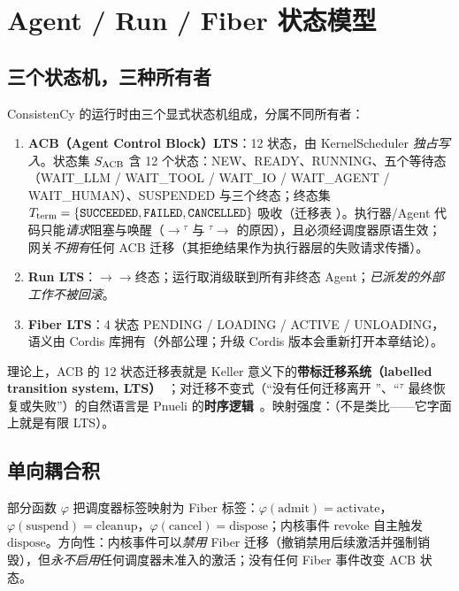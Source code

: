 \chapter{Agent / Run / Fiber 状态模型}\label{ch:states}

\section{三个状态机，三种所有者}

ConsistenCy 的运行时由三个显式状态机组成，分属不同所有者：
\begin{enumerate}[itemsep=0.1em]
  \item \textbf{ACB（Agent Control Block）LTS}：12 状态，由 KernelScheduler \emph{独占写入}。状态集 $S_{\mathrm{ACB}}$ 含 12 个状态：NEW、READY、RUNNING、五个等待态（WAIT\_LLM / WAIT\_TOOL / WAIT\_IO / WAIT\_AGENT / WAIT\_HUMAN）、SUSPENDED 与三个终态；终态集 $T_{\mathrm{term}}=\{\texttt{SUCCEEDED},\texttt{FAILED},\texttt{CANCELLED}\}$ 吸收（迁移表 ）。执行器/Agent 代码只能\emph{请求}阻塞与唤醒（$\to$$^\tau$ 与 $^\tau\to$ 的原因），且必须经调度器原语生效；网关\emph{不拥有}任何 ACB 迁移（其拒绝结果作为执行器层的失败请求传播）。
  \item \textbf{Run LTS}：$\to$$\to$终态；运行取消级联到所有非终态 Agent；\emph{已派发的外部工作不被回滚}。
  \item \textbf{Fiber LTS}：4 状态 PENDING / LOADING / ACTIVE / UNLOADING，语义由 Cordis 库拥有（外部公理；升级 Cordis 版本会重新打开本章结论）。
\end{enumerate}

理论上，ACB 的 12 状态迁移表就是 Keller 意义下的\textbf{带标迁移系统（labelled transition system, LTS）}~\cite{keller1976}；对迁移不变式（“没有任何迁移离开 ”、“$^\tau$ 最终恢复或失败”）的自然语言是 Pnueli 的\textbf{时序逻辑}~\cite{pnueli1977}。映射强度：\DIRECT{}（不是类比——它字面上就是有限 LTS）。

\section{单向耦合积}

\begin{definition}\label{def:coupling}
部分函数 $\varphi$ 把调度器标签映射为 Fiber 标签：$\varphi(\mathrm{admit})=\mathrm{activate}$，$\varphi(\mathrm{suspend})=\mathrm{cleanup}$，$\varphi(\mathrm{cancel})=\mathrm{dispose}$；内核事件 $\mathrm{revoke}$ 自主触发 $\mathrm{dispose}$。方向性：内核事件可以\emph{禁用} Fiber 迁移（撤销禁用后续激活并强制销毁），但\emph{永不启用}任何调度器未准入的激活；没有任何 Fiber 事件改变 ACB 状态。
\end{definition}

